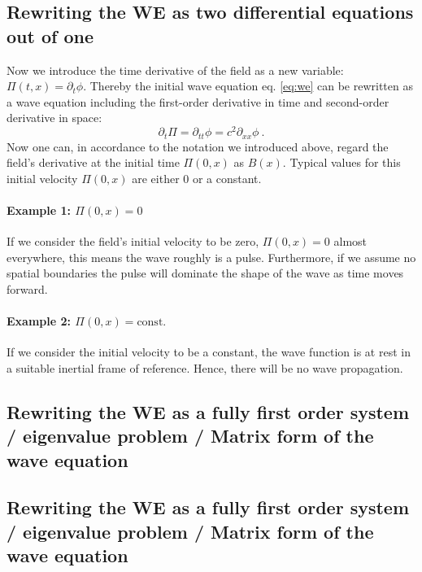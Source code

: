 \subsection{Rewriting the WE as two differential equations out of one}
Now we introduce the time derivative of the field as a new variable: $\Pi (t,x) = \partial_t \phi$. Thereby the initial wave equation eq. \ref{eq:we} can be rewritten as a wave equation including the first-order derivative in time and second-order derivative in space:
\begin{equation}
	\partial_t \Pi = \partial_{tt} \phi =  c^2 \partial_{xx}\phi ~.
\end{equation}
Now one can, in accordance to the notation we introduced above, regard the field's derivative at the initial time $\Pi(0,x)$ as $B(x)$.
Typical values for this initial velocity $\Pi (0,x)$ are either 0 or a constant.

\paragraph{Example 1: $\Pi(0,x) = 0$}
If we consider the field's initial velocity to be zero, $\Pi(0,x) = 0$ almost everywhere, this means the wave roughly is a pulse. Furthermore, if we assume no spatial boundaries the pulse will dominate the shape of the wave as time moves forward.
\paragraph{Example 2: $\Pi(0,x) = \text{const.}$}
If we consider the initial velocity to be a constant, the wave function is at rest in a suitable inertial frame of reference. Hence, there will be no wave propagation.



\subsection{Rewriting the WE as a fully first order system / eigenvalue problem / Matrix form of the wave equation}


\subsection{Rewriting the WE as a fully first order system / eigenvalue problem / Matrix form of the wave equation}

